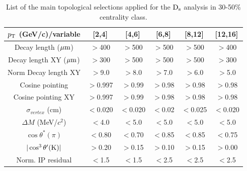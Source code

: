 \begin{table}[!h]
 \begin{center}
  \begin{tabular}{|c|c|c|c|c|c|}
\hline
$p_{\rm T}$ (GeV/c)/variable & [2,4] & [4,6] & [6,8] & [8,12] & [12,16] \\
\hline
\hline
Decay length ($\mathrm{\mu m}$)        & $>$400 & $>$500 & $>$500 & $>$500 & $>$400\\
\hline
Decay length XY ($\mathrm{\mu m}$)     & $>$300 & $>$500 & $>$500 & $>$500 & $>$300\\
\hline
Norm Decay length XY          & $>$9.0& $>$8.0 & $>$7.0 & $>$6.0 & $>$5.0\\
\hline
Cosine pointing              & $>$0.997 & $>$0.99 & $>$0.98 & $>$0.98 & $>$0.98\\
\hline
Cosine pointing XY        & $>$0.997 & $>$0.99 & $>$0.98 & $>$0.98 & $>$0.98\\
\hline
$\sigma_{vertex}$  (cm)          & $<$0.020 & $<$0.020 & $<$0.02 & $<$0.025 & $<$0.020\\
\hline
$\Delta M$ (MeV/$c^{2}$) & $<$4.0 & $<$5.0 & $<$5.0 & $<$5.0 & $<$5.0\\
\hline
$\cos \theta^*(\pi)$    & $<$0.80 & $<$0.70 & $<$0.85 & $<$0.85 & $<$0.75\\
\hline
$|\cos^3 \theta^\prime({\rm K})|$        & $>$0.20 & $>$0.15 & $>$0.10 & $>$0.15 & $>$0.00\\
\hline
Norm. IP residual   & $<$1.5 & $<$1.5 & $<$2.5 & $<$2.5 & $<$2.5 \\
\hline
  \end{tabular}
 \caption{List of the main topological selections applied for the
   ${\rm D_s}$ analysis in 30-50\% centrality class.}
 \label{tab:topologicalselections_ds_3050}
 \end{center}
\end{table} 


